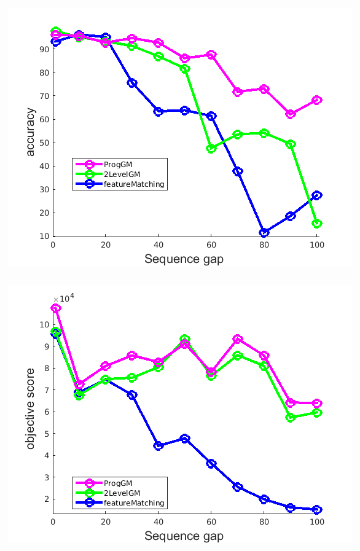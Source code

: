 \documentclass[
	fontsize=12pt,
	paper=a4,
	twoside=false,
	numbers=noenddot,
	plainheadsepline,
	toc=listof,
	toc=bibliography
]{scrartcl}
\begin{document}
\begin{figure}[h] 
	\begin{subfigure}[b]{0.3\textwidth}
		\centering
		\includegraphics[scale=0.25]{"fig_ver2608/RealImages/HouseSeq/anchor_descr/using_cpd_afftrafo/ext_solution/performance/accuracy"} 
	\end{subfigure}%
	\begin{subfigure}[b]{0.3\textwidth}
		\centering
		\includegraphics[scale=0.25]{"fig_ver2608/RealImages/HouseSeq/anchor_descr/using_cpd_afftrafo/ext_solution/performance/score"}  
	\end{subfigure} 
	\begin{subfigure}[b]{0.3\textwidth}
		\centering

\end{subfigure}
\end{figure}
\end{document}
